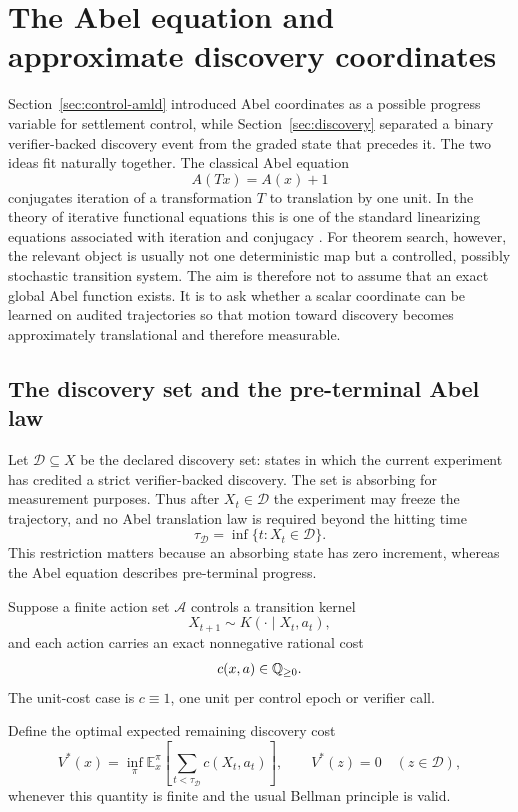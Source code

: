 \section{The Abel equation and approximate discovery coordinates}\label{sec:abel-discovery}

Section~\ref{sec:control-amld} introduced Abel coordinates as a possible progress variable for settlement control, while Section~\ref{sec:discovery} separated a binary verifier-backed discovery event from the graded state that precedes it. The two ideas fit naturally together. The classical Abel equation
\[
A(Tx)=A(x)+1
\]
conjugates iteration of a transformation $T$ to translation by one unit. In the theory of iterative functional equations this is one of the standard linearizing equations associated with iteration and conjugacy \cite{kuczmaife}. For theorem search, however, the relevant object is usually not one deterministic map but a controlled, possibly stochastic transition system. The aim is therefore not to assume that an exact global Abel function exists. It is to ask whether a scalar coordinate can be learned on audited trajectories so that motion toward discovery becomes approximately translational and therefore measurable.

\subsection{The discovery set and the pre-terminal Abel law}
Let $\mathcal D\subseteq X$ be the declared discovery set: states in which the current experiment has credited a strict verifier-backed discovery. The set is absorbing for measurement purposes. Thus after $X_t\in\mathcal D$ the experiment may freeze the trajectory, and no Abel translation law is required beyond the hitting time
\[
\tau_{\mathcal D}=\inf\{t:X_t\in\mathcal D\}.
\]
This restriction matters because an absorbing state has zero increment, whereas the Abel equation describes pre-terminal progress.

Suppose a finite action set $\mathcal A$ controls a transition kernel
\[
X_{t+1}\sim K(\cdot\mid X_t,a_t),
\]
and each action carries an exact nonnegative rational cost
\[
c(x,a)\in\mathbb{Q}_{\ge 0}.
\]
The unit-cost case is $c\equiv1$, one unit per control epoch or verifier call.

Define the optimal expected remaining discovery cost
\[
V^*(x)=\inf_{\pi}\mathbb E_x^\pi\!\left[\sum_{t<\tau_{\mathcal D}}c(X_t,a_t)\right],
\qquad V^*(z)=0\quad(z\in\mathcal D),
\]
whenever this quantity is finite and the usual Bellman principle is valid.

